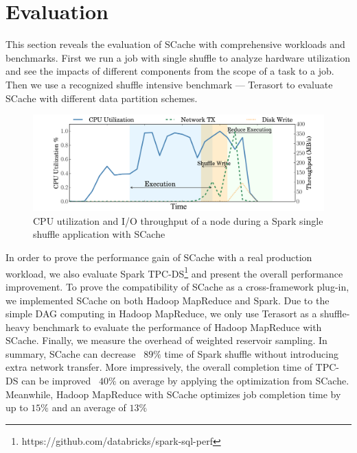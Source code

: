 \section{Evaluation}\label{evaluation}
This section reveals the evaluation of SCache with comprehensive workloads and benchmarks. 
First we run a job with single shuffle to analyze hardware utilization and see the impacts of different components from the scope of a task to a job. 
Then we use a recognized shuffle intensive benchmark --- Terasort to evaluate SCache with different data partition schemes.

\begin{figure}
	\includegraphics[width=.8\linewidth]{fig/scache_util}
	\caption{CPU utilization and I/O throughput of a node during a Spark single shuffle application with SCache}
	\label{fig:scache_util}
\end{figure}

In order to prove the performance gain of SCache with a real production workload, we also evaluate Spark TPC-DS\footnote{https://github.com/databricks/spark-sql-perf} and present the overall performance improvement.
{\color{blue}
To prove the compatibility of SCache as a cross-framework plug-in, we implemented SCache on both Hadoop MapReduce and Spark. 
Due to the simple DAG computing in Hadoop MapReduce, we only use Terasort as a shuffle-heavy benchmark to evaluate the performance of Hadoop MapReduce with SCache.
}
Finally, we measure the overhead of weighted reservoir sampling. 
In summary, SCache can decrease ~$89\%$ time of Spark shuffle without introducing extra network transfer.
More impressively, the overall completion time of TPC-DS can be improved ~$40\%$ on average by applying the optimization from SCache.
{\color{blue}Meanwhile, Hadoop MapReduce with SCache optimizes job completion time by up to $15\%$ and an average of $13\%$}

